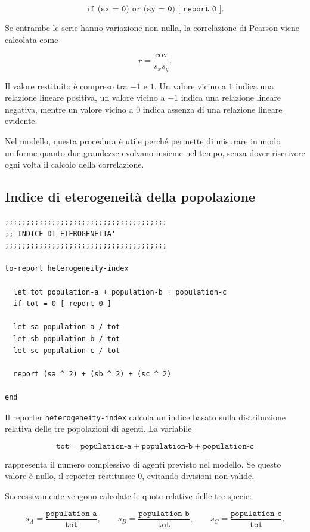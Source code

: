 \[
\texttt{if (sx = 0) or (sy = 0) [ report 0 ]}.
\]

Se entrambe le serie hanno variazione non nulla, la correlazione di Pearson viene
calcolata come

\[
r =
\frac{\text{cov}}{s_x s_y}.
\]

Il valore restituito è compreso tra \(-1\) e \(1\). Un valore vicino a \(1\)
indica una relazione lineare positiva, un valore vicino a \(-1\) indica una
relazione lineare negativa, mentre un valore vicino a \(0\) indica assenza di una
relazione lineare evidente.

Nel modello, questa procedura è utile perché permette di misurare in modo
uniforme quanto due grandezze evolvano insieme nel tempo, senza dover riscrivere
ogni volta il calcolo della correlazione.

\subsection{Indice di eterogeneità della popolazione}

\begin{lstlisting}[caption={Reporter per l'indice di eterogeneità delle specie}]
;;;;;;;;;;;;;;;;;;;;;;;;;;;;;;;;;;;;;;
;; INDICE DI ETEROGENEITA'
;;;;;;;;;;;;;;;;;;;;;;;;;;;;;;;;;;;;;;

to-report heterogeneity-index

  let tot population-a + population-b + population-c
  if tot = 0 [ report 0 ]

  let sa population-a / tot
  let sb population-b / tot
  let sc population-c / tot

  report (sa ^ 2) + (sb ^ 2) + (sc ^ 2)

end
\end{lstlisting}

Il reporter \texttt{heterogeneity-index} calcola un indice basato sulla
distribuzione relativa delle tre popolazioni di agenti. La variabile

\[
\texttt{tot}
=
\texttt{population-a}
+
\texttt{population-b}
+
\texttt{population-c}
\]

rappresenta il numero complessivo di agenti previsto nel modello. Se questo
valore è nullo, il reporter restituisce \(0\), evitando divisioni non valide.

Successivamente vengono calcolate le quote relative delle tre specie:

\[
s_A =
\frac{\texttt{population-a}}{\texttt{tot}},
\qquad
s_B =
\frac{\texttt{population-b}}{\texttt{tot}},
\qquad
s_C =
\frac{\texttt{population-c}}{\texttt{tot}}.
\]

